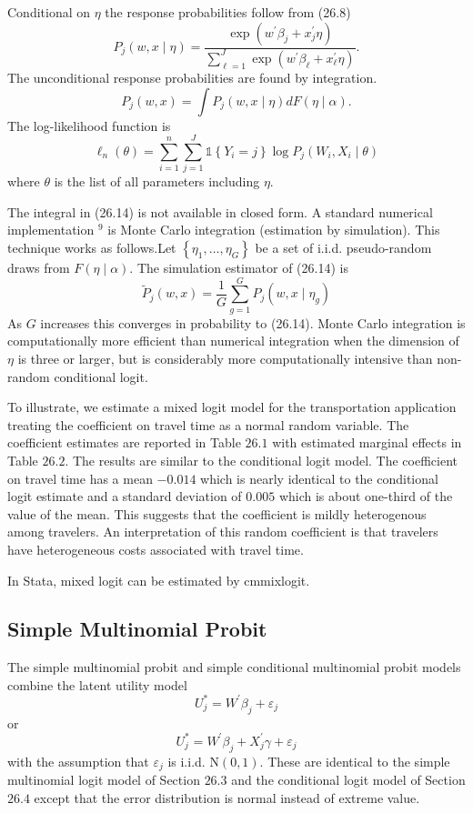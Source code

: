 \documentclass[10pt]{article}
\begin{document}
Conditional on $\eta$ the response probabilities follow from (26.8)
$$
P_{j}(w, x \mid \eta)=\frac{\exp \left(w^{\prime} \beta_{j}+x_{j}^{\prime} \eta\right)}{\sum_{\ell=1}^{J} \exp \left(w^{\prime} \beta_{\ell}+x_{\ell}^{\prime} \eta\right)} .
$$
The unconditional response probabilities are found by integration.
$$
P_{j}(w, x)=\int P_{j}(w, x \mid \eta) d F(\eta \mid \alpha) .
$$
The log-likelihood function is
$$
\ell_{n}(\theta)=\sum_{i=1}^{n} \sum_{j=1}^{J} \mathbb{1}\left\{Y_{i}=j\right\} \log P_{j}\left(W_{i}, X_{i} \mid \theta\right)
$$
where $\theta$ is the list of all parameters including $\eta$.

The integral in (26.14) is not available in closed form. A standard numerical implementation ${ }^{9}$ is Monte Carlo integration (estimation by simulation). This technique works as follows.Let $\left\{\eta_{1}, \ldots, \eta_{G}\right\}$ be a set of i.i.d. pseudo-random draws from $F(\eta \mid \alpha)$. The simulation estimator of (26.14) is
$$
\widetilde{P}_{j}(w, x)=\frac{1}{G} \sum_{g=1}^{G} P_{j}\left(w, x \mid \eta_{g}\right)
$$
As $G$ increases this converges in probability to (26.14). Monte Carlo integration is computationally more efficient than numerical integration when the dimension of $\eta$ is three or larger, but is considerably more computationally intensive than non-random conditional logit.

To illustrate, we estimate a mixed logit model for the transportation application treating the coefficient on travel time as a normal random variable. The coefficient estimates are reported in Table $26.1$ with estimated marginal effects in Table $26.2$. The results are similar to the conditional logit model. The coefficient on travel time has a mean $-0.014$ which is nearly identical to the conditional logit estimate and a standard deviation of $0.005$ which is about one-third of the value of the mean. This suggests that the coefficient is mildly heterogenous among travelers. An interpretation of this random coefficient is that travelers have heterogeneous costs associated with travel time.

In Stata, mixed logit can be estimated by cmmixlogit.

\subsection{Simple Multinomial Probit}
The simple multinomial probit and simple conditional multinomial probit models combine the latent utility model
$$
U_{j}^{*}=W^{\prime} \beta_{j}+\varepsilon_{j}
$$
or
$$
U_{j}^{*}=W^{\prime} \beta_{j}+X_{j}^{\prime} \gamma+\varepsilon_{j}
$$
with the assumption that $\varepsilon_{j}$ is i.i.d. $\mathrm{N}(0,1)$. These are identical to the simple multinomial logit model of Section $26.3$ and the conditional logit model of Section $26.4$ except that the error distribution is normal instead of extreme value.
\end{document}
